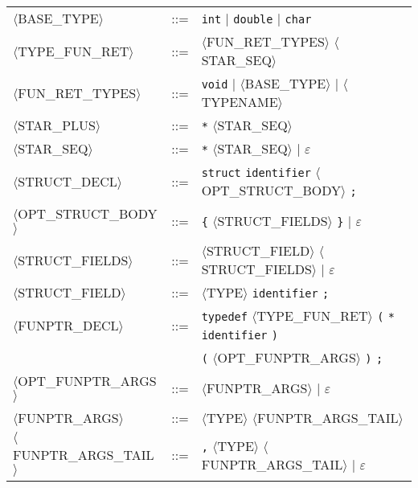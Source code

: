 \begin{footnotesize}
\begin{longtable}{>{\raggedright\arraybackslash}p{4cm}@{\ }>{\raggedright\arraybackslash}p{1.5cm}@{\ }>{\raggedright\arraybackslash}p{8.5cm}}
      $\langle$BASE\_TYPE$\rangle$ & ::= & \texttt{int} $\mid$ \texttt{double} $\mid$ \texttt{char} \\
      
      $\langle$TYPE\_FUN\_RET$\rangle$ & ::= & $\langle$FUN\_RET\_TYPES$\rangle$ $\langle$STAR\_SEQ$\rangle$ \\
      
      $\langle$FUN\_RET\_TYPES$\rangle$ & ::= & \texttt{void} $\mid$ $\langle$BASE\_TYPE$\rangle$ $\mid$ $\langle$TYPENAME$\rangle$ \\
      
      $\langle$STAR\_PLUS$\rangle$ & ::= & \texttt{*} $\langle$STAR\_SEQ$\rangle$ \\
      
      $\langle$STAR\_SEQ$\rangle$ & ::= & \texttt{*} $\langle$STAR\_SEQ$\rangle$ $\mid$ $\varepsilon$ \\
      
      $\langle$STRUCT\_DECL$\rangle$ & ::= & \texttt{struct} \texttt{identifier} $\langle$OPT\_STRUCT\_BODY$\rangle$ \texttt{;} \\
      
      $\langle$OPT\_STRUCT\_BODY$\rangle$ & ::= & \texttt{\{} $\langle$STRUCT\_FIELDS$\rangle$ \texttt{\}} $\mid$ $\varepsilon$ \\
      
      $\langle$STRUCT\_FIELDS$\rangle$ & ::= & $\langle$STRUCT\_FIELD$\rangle$ $\langle$STRUCT\_FIELDS$\rangle$ $\mid$ $\varepsilon$ \\
      
      $\langle$STRUCT\_FIELD$\rangle$ & ::= & $\langle$TYPE$\rangle$ \texttt{identifier} \texttt{;} \\
      
      $\langle$FUNPTR\_DECL$\rangle$ & ::= & \texttt{typedef} $\langle$TYPE\_FUN\_RET$\rangle$ \texttt{(} \texttt{*} \texttt{identifier} \texttt{)} \\
      & & \texttt{(} $\langle$OPT\_FUNPTR\_ARGS$\rangle$ \texttt{)} \texttt{;} \\
      
      $\langle$OPT\_FUNPTR\_ARGS$\rangle$ & ::= & $\langle$FUNPTR\_ARGS$\rangle$ $\mid$ $\varepsilon$ \\
      
      $\langle$FUNPTR\_ARGS$\rangle$ & ::= & $\langle$TYPE$\rangle$ $\langle$FUNPTR\_ARGS\_TAIL$\rangle$ \\
      
      $\langle$FUNPTR\_ARGS\_TAIL$\rangle$ & ::= & \texttt{,} $\langle$TYPE$\rangle$ $\langle$FUNPTR\_ARGS\_TAIL$\rangle$ $\mid$ $\varepsilon$ \\
      

\end{longtable}
\end{footnotesize}
